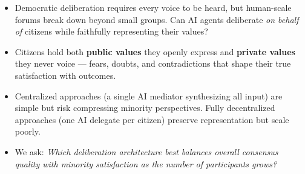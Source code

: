 \documentclass{article}
\newcommand{\bodytextspacing}{1.4}       %
\newcommand{\sectionafterspace}{0.8em}   %
\newcommand{\sectionheading}[1]{%
  \vspace{1.2em}%
  \noindent{\fontsize{36}{44}\selectfont\textbf{\textcolor{pivotalOrange}{#1}}}%
  \vspace{\sectionafterspace}\par%
}
\newlength{\panelmargin}
\begin{document}
\noindent
\colorbox{pivotalAliceBlue}{%
  \parbox[t]{\dimexpr\paperwidth-2\fboxsep\relax}{%
    \color{pivotalNight}
    \vspace{1.5cm}
    \hspace{\panelmargin}
    \begin{minipage}[t]{\dimexpr\paperwidth-2\panelmargin-2\fboxsep\relax}

      \fontsize{20}{28}\selectfont
      \renewcommand{\baselinestretch}{\bodytextspacing}\selectfont

      \noindent
      \begin{minipage}[t]{0.47\linewidth}

        \sectionheading{Motivation}
        \begin{itemize}\setlength{\itemsep}{0.4cm}
          \item Democratic deliberation requires every voice to be heard, but human-scale forums break down beyond small groups. Can AI agents deliberate \textit{on behalf of} citizens while faithfully representing their values?
          \item Citizens hold both \textbf{public values} they openly express and \textbf{private values} they never voice --- fears, doubts, and contradictions that shape their true satisfaction with outcomes.
          \item Centralized approaches (a single AI mediator synthesizing all input) are simple but risk compressing minority perspectives. Fully decentralized approaches (one AI delegate per citizen) preserve representation but scale poorly.
          \item We ask: \textit{Which deliberation architecture best balances overall consensus quality with minority satisfaction as the number of participants grows?}
        \end{itemize}


\end{minipage}
\end{minipage}}}
\end{document}
